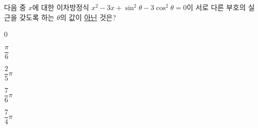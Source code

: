 다음 중 $x$에 대한 이차방정식 $x^2-3x+\sin^2\theta-3\cos^2\theta=0$이 서로 다른 부호의 실근을 갖도록 하는 $\theta$의 값이 \underline{아닌} 것은? \cond{$0\le\theta\le 2\pi$}
\begin{choices32}{\rule[-3ex]{0pt}{8ex}$0$}{\rule[-3ex]{0pt}{8ex}$\dfrac{\pi}{6}$}{\rule[-3ex]{0pt}{8ex}$\dfrac{2}{5}\pi$}{\rule[-3ex]{0pt}{8ex}$\dfrac{7}{6}\pi$}{\rule[-3ex]{0pt}{8ex}$\dfrac{7}{4}\pi$}\end{choices32}
